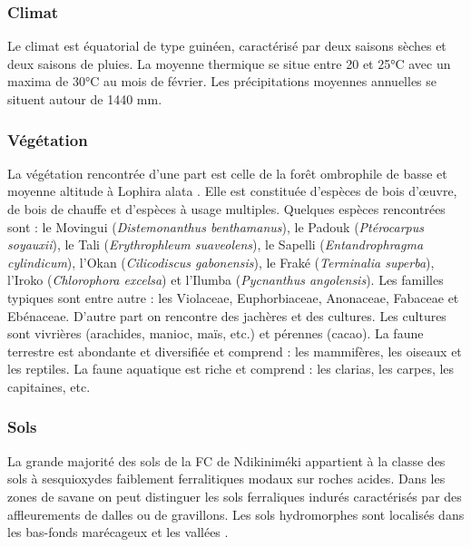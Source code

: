 \documentclass[
  12pt,
  a4paper,
  extrafontsizes,
  onecolumn,
  openright]{book}
\theoremstyle{definition}
\theoremstyle{definition}
\theoremstyle{definition}
\theoremstyle{definition}
\theoremstyle{remark}
\begin{document}
\hypertarget{climat-1}{%
\subsubsection{Climat}\label{climat-1}}

Le climat est équatorial de type guinéen, caractérisé par deux saisons sèches et deux saisons de pluies. La moyenne thermique se situe entre 20 et 25°C avec un maxima de 30°C au mois de février. Les précipitations moyennes annuelles se situent autour de 1440 mm.

\hypertarget{vuxe9guxe9tation-1}{%
\subsubsection{Végétation}\label{vuxe9guxe9tation-1}}

La végétation rencontrée d'une part est celle de la forêt ombrophile de basse et moyenne altitude à Lophira alata \citep{Letouzey1958}. Elle est constituée d'espèces de bois d'œuvre, de bois de chauffe et d'espèces à usage multiples. Quelques espèces rencontrées sont : le Movingui (\emph{Distemonanthus benthamanus}), le Padouk (\emph{Ptérocarpus soyauxii}), le Tali (\emph{Erythrophleum suaveolens}), le Sapelli (\emph{Entandrophragma cylindicum}), l'Okan (\emph{Cilicodiscus gabonensis}), le Fraké (\emph{Terminalia superba}), l'Iroko (\emph{Chlorophora excelsa}) et l'Ilumba (\emph{Pycnanthus angolensis}). Les familles typiques sont entre autre : les Violaceae, Euphorbiaceae, Anonaceae, Fabaceae et Ebénaceae. D'autre part on rencontre des jachères et des cultures. Les cultures sont vivrières (arachides, manioc, maïs, etc.) et pérennes (cacao). La faune terrestre est abondante et diversifiée et comprend : les mammifères, les oiseaux et les reptiles. La faune aquatique est riche et comprend : les clarias, les carpes, les capitaines, etc.

\hypertarget{sols-1}{%
\subsubsection{Sols}\label{sols-1}}

La grande majorité des sols de la FC de Ndikiniméki appartient à la classe des sols à sesquioxydes faiblement ferralitiques modaux sur roches acides. Dans les zones de savane on peut distinguer les sols ferraliques indurés caractérisés par des affleurements de dalles ou de gravillons. Les sols hydromorphes sont localisés dans les bas-fonds marécageux et les vallées \citep{Anonyme2012c}.
\end{document}
